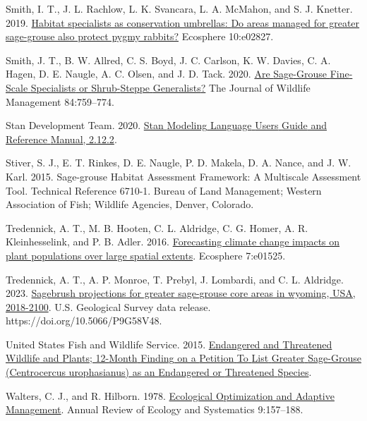 \documentclass[
  12pt,
]{article}
\newlength{\cslhangindent}
\newlength{\cslentryspacingunit} %
\newenvironment{CSLReferences}[2] %
 {%
  \setlength{\parindent}{0pt}
  \ifodd #1
  \let\oldpar\par
  \def\par{\hangindent=\cslhangindent\oldpar}
  \fi
  \setlength{\parskip}{#2\cslentryspacingunit}
 }%
 {}
\begin{document}
\begin{CSLReferences}{1}{0}
\leavevmode{}%
Smith, I. T., J. L. Rachlow, L. K. Svancara, L. A. McMahon, and S. J. Knetter. 2019. \href{https://doi.org/10.1002/ecs2.2827}{Habitat specialists as conservation umbrellas: {Do} areas managed for greater sage-grouse also protect pygmy rabbits?} Ecosphere 10:e02827.

\leavevmode{}%
Smith, J. T., B. W. Allred, C. S. Boyd, J. C. Carlson, K. W. Davies, C. A. Hagen, D. E. Naugle, A. C. Olsen, and J. D. Tack. 2020. \href{https://doi.org/10.1002/jwmg.21837}{Are {Sage}-{Grouse} {Fine}-{Scale} {Specialists} or {Shrub}-{Steppe} {Generalists}?} The Journal of Wildlife Management 84:759--774.

\leavevmode{}%
Stan Development Team. 2020. \href{https://mc-stan.org}{Stan {Modeling} {Language} {Users} {Guide} and {Reference} {Manual}, 2.12.2}.

\leavevmode{}%
Stiver, S. J., E. T. Rinkes, D. E. Naugle, P. D. Makela, D. A. Nance, and J. W. Karl. 2015. Sage-grouse {Habitat} {Assessment} {Framework}: {A} {Multiscale} {Assessment} {Tool}. {Technical} {Reference} 6710-1. Bureau of Land Management; Western Association of Fish; Wildlife Agencies, Denver, Colorado.

\leavevmode{}%
Tredennick, A. T., M. B. Hooten, C. L. Aldridge, C. G. Homer, A. R. Kleinhesselink, and P. B. Adler. 2016. \href{https://doi.org/10.1002/ecs2.1525}{Forecasting climate change impacts on plant populations over large spatial extents}. Ecosphere 7:e01525.

\leavevmode{}%
Tredennick, A. T., A. P. Monroe, T. Prebyl, J. Lombardi, and C. L. Aldridge. 2023. \href{https://doi.org/10.5066/P9G58V48}{Sagebrush projections for greater sage-grouse core areas in wyoming, USA, 2018-2100}. U.S. Geological Survey data release. https://doi.org/10.5066/P9G58V48.

\leavevmode{}%
United States Fish and Wildlife Service. 2015. \href{https://www.federalregister.gov/documents/2015/10/02/2015-24292/endangered-and-threatened-wildlife-and-plants-12-month-finding-on-a-petition-to-list-greater}{Endangered and {Threatened} {Wildlife} and {Plants}; 12-{Month} {Finding} on a {Petition} {To} {List} {Greater} {Sage}-{Grouse} ({Centrocercus} urophasianus) as an {Endangered} or {Threatened} {Species}}.

\leavevmode{}%
Walters, C. J., and R. Hilborn. 1978. \href{https://doi.org/10.1146/annurev.es.09.110178.001105}{Ecological {Optimization} and {Adaptive} {Management}}. Annual Review of Ecology and Systematics 9:157--188.

\end{CSLReferences}
\end{document}

